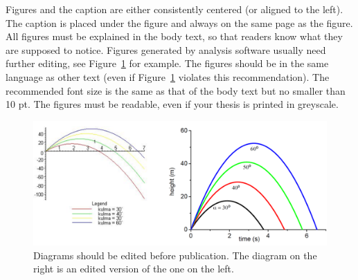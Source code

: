 \documentclass[12pt,a4paper,english
]{tunithesis}
\begin{document}
Figures and the caption are either consistently centered (or aligned
to the left). The caption is placed under the figure and always on the
same page as the figure. All figures must be explained in the body
text, so that readers know what they are supposed to notice. Figures
generated by analysis software usually need further editing, see
Figure~\ref{fig:ex_fig} for example. The figures should be in the same
language as other text (even if Figure~\ref{fig:ex_fig} violates this
recommendation). The recommended font size is the same as that of the
body text but no smaller than 10 pt. The figures must be readable,
even if your thesis is printed in greyscale.



\begin{figure}[t]
  \begin{center}
    \includegraphics[width=1.0\textwidth]{exampleFig}
  \end{center}
  \caption[Diagrams should be edited before publication.]{Diagrams
    should be edited before publication. The diagram on the right is
    an edited version of the one on the left.}
  \label{fig:ex_fig}
\end{figure}
\end{document}
